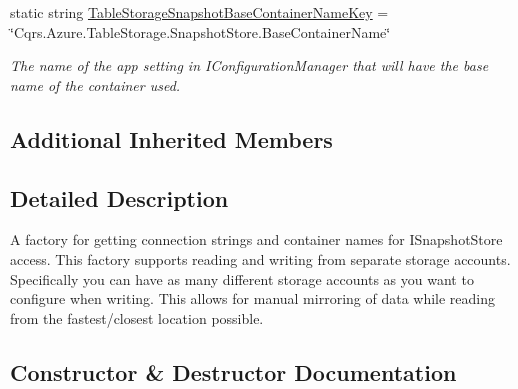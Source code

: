 \begin{DoxyCompactItemize}
static string \hyperlink{classCqrs_1_1Azure_1_1BlobStorage_1_1Events_1_1TableStorageSnapshotStoreConnectionStringFactory_a7bfe58a97886ad7832d5640b626c1ee5_a7bfe58a97886ad7832d5640b626c1ee5}{Table\+Storage\+Snapshot\+Base\+Container\+Name\+Key} = \char`\"{}Cqrs.\+Azure.\+Table\+Storage.\+Snapshot\+Store.\+Base\+Container\+Name\char`\"{}
\begin{DoxyCompactList}\small\item\em The name of the app setting in I\+Configuration\+Manager that will have the base name of the container used. \end{DoxyCompactList}\end{DoxyCompactItemize}
\subsection*{Additional Inherited Members}


\subsection{Detailed Description}
A factory for getting connection strings and container names for I\+Snapshot\+Store access. This factory supports reading and writing from separate storage accounts. Specifically you can have as many different storage accounts as you want to configure when writing. This allows for manual mirroring of data while reading from the fastest/closest location possible. 



\subsection{Constructor \& Destructor Documentation}
\mbox{\label{classCqrs_1_1Azure_1_1BlobStorage_1_1Events_1_1TableStorageSnapshotStoreConnectionStringFactory_adf49df18fd687cf39ee1c389c338e364_adf49df18fd687cf39ee1c389c338e364}} 
